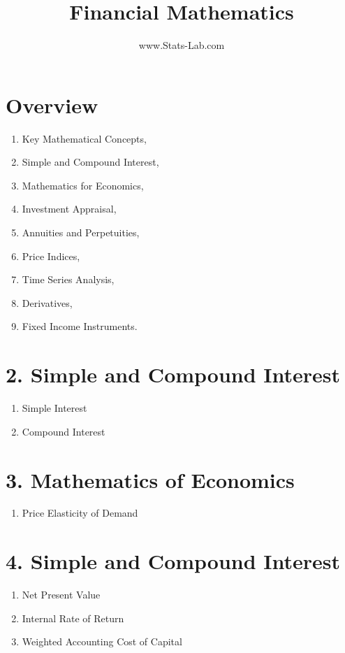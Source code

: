 \documentclass[12pt]{article}
\title{Financial Mathematics}
\author{www.Stats-Lab.com}
\begin{document}
\maketitle


\section{Overview}
\begin{enumerate}
\item Key Mathematical Concepts,
\item Simple and Compound Interest,
\item Mathematics for Economics,
\item Investment Appraisal,
\item Annuities and Perpetuities,
\item Price Indices,
\item Time Series Analysis,
\item Derivatives,
\item Fixed Income Instruments.
\end{enumerate}

\section*{2. Simple and Compound Interest}
\begin{enumerate}
\item Simple Interest
\item Compound Interest
\end{enumerate}

\section*{3. Mathematics of Economics}
\begin{enumerate}
\item Price Elasticity of Demand
\end{enumerate}

\section*{4. Simple and Compound Interest}
\begin{enumerate}
\item Net Present Value
\item Internal Rate of Return
\item Weighted Accounting Cost of Capital
\end{enumerate}
\end{document}

